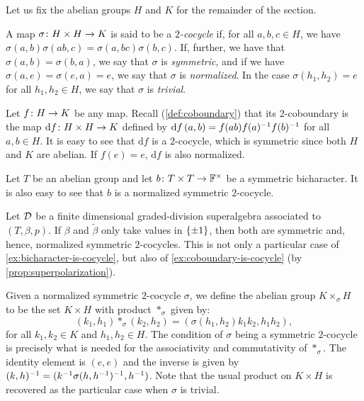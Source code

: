Let us fix the abelian groups $H$ and $K$ for the remainder of the section.

\begin{defi}\label{defi:cocycle}
	A map $\sigma\colon H\times H \to K$ is said to be a \emph{$2$-cocycle} if, for all $a,b,c \in H$, we have $\sigma(a,b) \sigma(ab, c) = \sigma(a, bc) \sigma(b,c)$.
	If, further, we have that $\sigma(a,b) = \sigma(b,a)$, we say that $\sigma$ is \emph{symmetric}, and if we have $\sigma(a, e) = \sigma(e, a) = e$, we say that $\sigma$ is \emph{normalized}.
	In the case $\sigma(h_1, h_2) = e$ for all $h_1, h_2 \in H$, we say that $\sigma$ is \emph{trivial}.
\end{defi}


\begin{ex}\label{ex:coboundary-is-cocycle}
	Let $f\colon H \to K$ be any map. 
	Recall (\cref{def:coboundary}) that its $2$-coboundary is the map $\mathrm{d} f\colon H\times H \to K$ defined by $\mathrm{d} f\, (a,b) = f(ab)f(a)^{-1} f(b)^{-1}$ for all $a,b \in H$. 
	It is easy to see that $\mathrm{d} f$ is a $2$-cocycle, which is symmetric since both $H$ and $K$ are abelian. 
	If $f(e) = e$, $\mathrm{d} f$ is also normalized. 
\end{ex}

\begin{ex}\label{ex:bicharacter-is-cocycle}
    Let $T$ be an abelian group and let $b\colon T\times T \to \mathbb{F}^\times$ be a symmetric bicharacter. 
    It is also easy to see that $b$ is a normalized symmetric $2$-cocycle. 
\end{ex}

\begin{ex}\label{ex:beta-is-cocycle}
    Let $\mathcal{D}$ be a finite dimensional graded-division superalgebra associated to $(T, \beta, p)$. 
    If $\beta$ and $\tilde\beta$ only take values in $\{ \pm 1 \}$, then both are symmetric and, hence, normalized symmetric $2$-cocycles. 
    This is not only a particular case of \cref{ex:bicharacter-is-cocycle}, but also of \cref{ex:coboundary-is-cocycle} (by \cref{prop:superpolarization}). 
\end{ex}


Given a normalized symmetric $2$-cocycle $\sigma$, we define the abelian group $K \times_\sigma H$ to be the set $K\times H$ with product $*_\sigma$ given by:
\[
	(k_1, h_1)*_\sigma(k_2, h_2) = (\sigma(h_1, h_2) k_1 k_2, h_1 h_2),
\]
for all $k_1, k_2 \in K$ and $h_1, h_2 \in H$.
The condition of $\sigma$ being a symmetric $2$-cocycle is precisely what is needed for the associativity and commutativity of $*_\sigma$.
The identity element is $(e, e)$ and the inverse is given by $(k, h)^{-1} = (k^{-1} \sigma(h,h^{-1})^{-1}, h^{-1})$.
Note that the usual product on $K\times H$ is recovered as the particular case when $\sigma$ is trivial.

